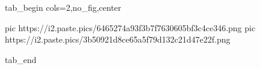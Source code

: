  
 
 
 
 
\zzSecCmtScr

\ifcmt
  tab_begin cols=2,no_fig,center

     pic https://i2.paste.pics/6465274a93f3b7f7630605bf3c4ce346.png
		 pic https://i2.paste.pics/3b50921d8ce65a5f79d132c21d47e22f.png

  tab_end
\fi
